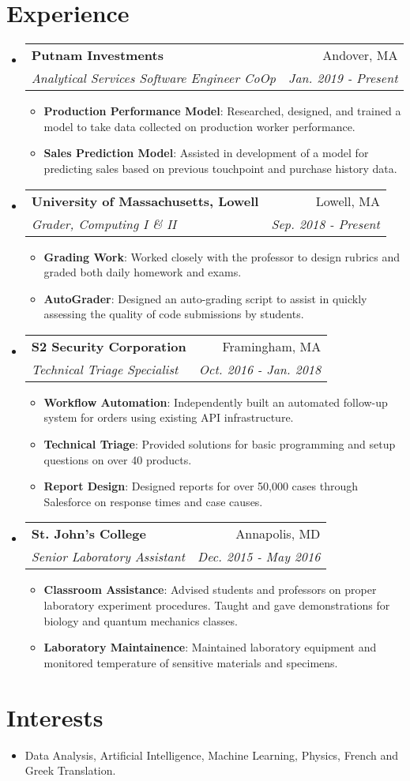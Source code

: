 \documentclass[letterpaper,11pt]{article}
\makeatletter
\newcommand{\resumeItem}[2]{
  \item\small{
    \textbf{#1}{: #2 \vspace{-2pt}}
  }
}
\newcommand{\resumeSubheading}[4]{
  \vspace{-1pt}\item
    \begin{tabular*}{0.97\textwidth}{l@{\extracolsep{\fill}}r}
      \textbf{#1} & #2 \\
      \textit{\small#3} & \textit{\small #4} \\
    \end{tabular*}\vspace{-5pt}
}
\newcommand{\resumeSubHeadingListStart}{\begin{itemize}[leftmargin=*]}
\newcommand{\resumeSubHeadingListEnd}{\end{itemize}}
\newcommand{\resumeItemListStart}{\begin{itemize}}
\newcommand{\resumeItemListEnd}{\end{itemize}\vspace{-5pt}}
\makeatother
\begin{document}
  
\section{Experience}
  \resumeSubHeadingListStart

    \resumeSubheading
      {Putnam Investments}{Andover, MA}
      {Analytical Services Software Engineer CoOp}{Jan. 2019 - Present}
      \resumeItemListStart
        \resumeItem{Production Performance Model}
          {Researched, designed, and trained a model to take data collected on production worker performance. }
        \resumeItem{Sales Prediction Model}
          {Assisted in development of a model for predicting sales based on previous touchpoint and purchase history data.}
      \resumeItemListEnd

    \resumeSubheading
      {University of Massachusetts, Lowell}{Lowell, MA}
      {Grader, Computing I \& II}{Sep. 2018 - Present}
      \resumeItemListStart
        \resumeItem{Grading Work}
          {Worked closely with the professor to design rubrics and graded both daily homework and exams.}
        \resumeItem{AutoGrader}
          {Designed an auto-grading script to assist in quickly assessing the quality of code submissions by students.}
      \resumeItemListEnd

    \resumeSubheading
      {S2 Security Corporation}{Framingham, MA}
      {Technical Triage Specialist}{Oct. 2016 - Jan. 2018}
      \resumeItemListStart
        \resumeItem{Workflow Automation}
          {Independently built an automated follow-up system for orders using existing API infrastructure.}
        \resumeItem{Technical Triage}
          {Provided solutions for basic programming and setup questions on over 40 products.}
        \resumeItem{Report Design}
        	 {Designed reports for over 50,000 cases through Salesforce on response times and case causes.}
      \resumeItemListEnd

    \resumeSubheading
      {St. John's College}{Annapolis, MD}
      {Senior Laboratory Assistant}{Dec. 2015 - May 2016}
      \resumeItemListStart
        \resumeItem{Classroom Assistance}
          {Advised students and professors on proper laboratory experiment procedures. Taught and gave demonstrations for biology and quantum mechanics classes.}
        \resumeItem{Laboratory Maintainence}
          {Maintained laboratory equipment and monitored temperature of sensitive materials and specimens.}
      \resumeItemListEnd

  \resumeSubHeadingListEnd

\section{Interests}
  \resumeSubHeadingListStart
    \item{
      {Data Analysis, Artificial Intelligence, Machine Learning, Physics, French and Greek Translation.}
    }
  \resumeSubHeadingListEnd


%



\end{document}
